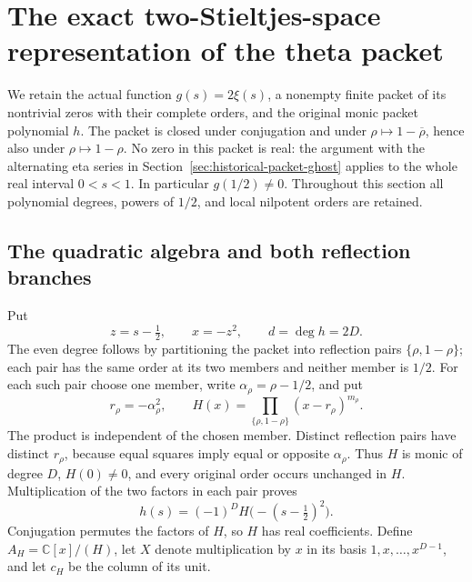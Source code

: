 \section{The exact two-Stieltjes-space representation of the theta packet}
\label{sec:theta-stieltjes-pair}

We retain the actual function \(g(s)=2\xi(s)\), a nonempty finite
packet of its nontrivial zeros with their complete orders, and the
original monic packet polynomial \(h\). The packet is closed under
conjugation and under \(\rho\mapsto1-\overline\rho\), hence also under
\(\rho\mapsto1-\rho\). No zero in this packet is real: the argument
with the alternating eta series in Section~\ref{sec:historical-packet-ghost} applies to
the whole real interval \(0<s<1\). In particular \(g(1/2)\ne0\).
Throughout this section all polynomial degrees, powers of \(1/2\),
and local nilpotent orders are retained.

\subsection{The quadratic algebra and both reflection branches}

Put
\[
 z=s-\tfrac12,\qquad x=-z^2,\qquad d=\deg h=2D.
 \tag{SP.1}
\]
The even degree follows by partitioning the packet into reflection
pairs \(\{\rho,1-\rho\}\); each pair has the same order at its two
members and neither member is \(1/2\). For each such pair choose one
member, write \(\alpha_\rho=\rho-1/2\), and put
\[
 r_\rho=-\alpha_\rho^2,\qquad
 H(x)=\prod_{\{\rho,1-\rho\}}(x-r_\rho)^{m_\rho}.
 \tag{SP.2}
\]
The product is independent of the chosen member. Distinct reflection
pairs have distinct \(r_\rho\), because equal squares imply equal or
opposite \(\alpha_\rho\). Thus \(H\) is monic of degree \(D\),
\(H(0)\ne0\), and every original order occurs unchanged in \(H\).
Multiplication of the two factors in each pair proves
\[
 h(s)=(-1)^D H\bigl(-(s-\tfrac12)^2\bigr).
 \tag{SP.3}
\]
Conjugation permutes the factors of \(H\), so \(H\) has real
coefficients. Define \(A_H=\mathbb C[x]/(H)\), let \(X\) denote
multiplication by \(x\) in its basis \(1,x,\ldots,x^{D-1}\), and
let \(c_H\) be the column of its unit.

